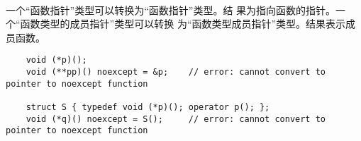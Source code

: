 \paragraph{} %
一个“函数指针”类型\prvalue{}可以转换为“函数指针”类型\prvalue{}。结
果为指向函数的指针。一个“函数类型的成员指针”类型\prvalue{}可以转换
为“函数类型成员指针”类型\prvalue{}。结果表示成员函数。

\begin{example}
  \begin{lstlisting}
    void (*p)();
    void (**pp)() noexcept = &p;    // error: cannot convert to pointer to noexcept function

    struct S { typedef void (*p)(); operator p(); };
    void (*q)() noexcept = S();     // error: cannot convert to pointer to noexcept function
  \end{lstlisting}
\end{example}
